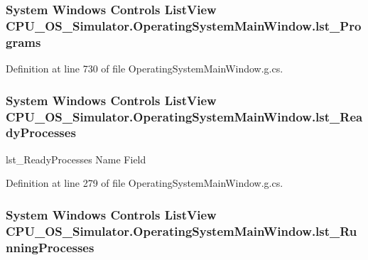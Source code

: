 \subsubsection[{lst\+\_\+\+Programs}]{\setlength{\rightskip}{0pt plus 5cm}System Windows Controls List\+View C\+P\+U\+\_\+\+O\+S\+\_\+\+Simulator.\+Operating\+System\+Main\+Window.\+lst\+\_\+\+Programs\hspace{0.3cm}{\ttfamily [package]}}\label{class_c_p_u___o_s___simulator_1_1_operating_system_main_window_a08c9b2131c204ca49f85c7dbc3c0bde2}


Definition at line 730 of file Operating\+System\+Main\+Window.\+g.\+cs.

\hypertarget{class_c_p_u___o_s___simulator_1_1_operating_system_main_window_a00397da2e841d089d65441f5d4f19915}{}
\subsubsection[{lst\+\_\+\+Ready\+Processes}]{\setlength{\rightskip}{0pt plus 5cm}System Windows Controls List\+View C\+P\+U\+\_\+\+O\+S\+\_\+\+Simulator.\+Operating\+System\+Main\+Window.\+lst\+\_\+\+Ready\+Processes}\label{class_c_p_u___o_s___simulator_1_1_operating_system_main_window_a00397da2e841d089d65441f5d4f19915}


lst\+\_\+\+Ready\+Processes Name Field 



Definition at line 279 of file Operating\+System\+Main\+Window.\+g.\+cs.

\hypertarget{class_c_p_u___o_s___simulator_1_1_operating_system_main_window_a8710fe75e8464b39764d29184c2510fd}{}
\subsubsection[{lst\+\_\+\+Running\+Processes}]{\setlength{\rightskip}{0pt plus 5cm}System Windows Controls List\+View C\+P\+U\+\_\+\+O\+S\+\_\+\+Simulator.\+Operating\+System\+Main\+Window.\+lst\+\_\+\+Running\+Processes}\label{class_c_p_u___o_s___simulator_1_1_operating_system_main_window_a8710fe75e8464b39764d29184c2510fd}


